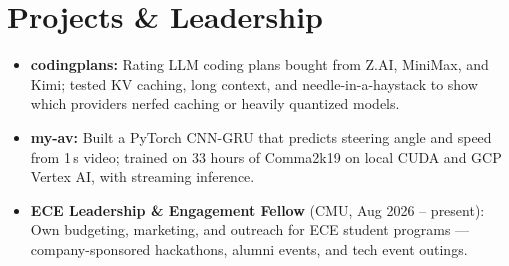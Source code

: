 \documentclass[11pt, letterpaper]{article}
\begin{document}
\section{Projects \& Leadership}
\begin{itemize}
  \item \textbf{codingplans:} Rating LLM coding plans bought from Z.AI, MiniMax, and Kimi; tested KV caching, long context, and needle-in-a-haystack to show which providers nerfed caching or heavily quantized models.
  \item \textbf{my-av:} Built a PyTorch CNN-GRU that predicts steering angle and speed from 1\,s video; trained on 33 hours of Comma2k19 on local CUDA and GCP Vertex AI, with streaming inference.
  \item \textbf{ECE Leadership \& Engagement Fellow} (CMU, Aug 2026 -- present): Own budgeting, marketing, and outreach for ECE student programs --- company-sponsored hackathons, alumni events, and tech event outings.
\end{itemize}
\end{document}

